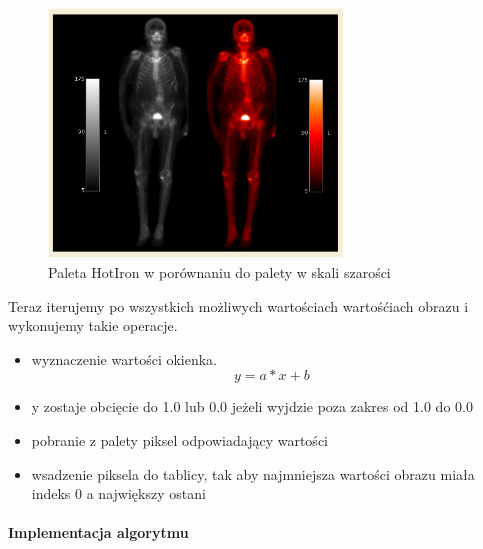 \begin{figure}[!htbp]
    \centering
    \includegraphics[width=0.7\textwidth]{img/monochrome-001.png}
    \caption{Paleta HotIron w porównaniu do palety w skali szarości}
    \label{fig:monochrome1}
\end{figure}

Teraz iterujemy po wszystkich możliwych wartościach wartośćiach obrazu i wykonujemy takie operacje.
\begin{itemize}
    \item wyznaczenie wartości okienka.
          \[y = a * x + b\]
    \item y zostaje obcięcie do 1.0 lub 0.0 jeżeli wyjdzie poza zakres od 1.0 do 0.0
    \item pobranie z palety piksel odpowiadający wartości
    \item wsadzenie piksela do tablicy, tak aby najmniejsza wartości obrazu miała indeks 0 a największy ostani
\end{itemize}


\paragraph{Implementacja algorytmu}

